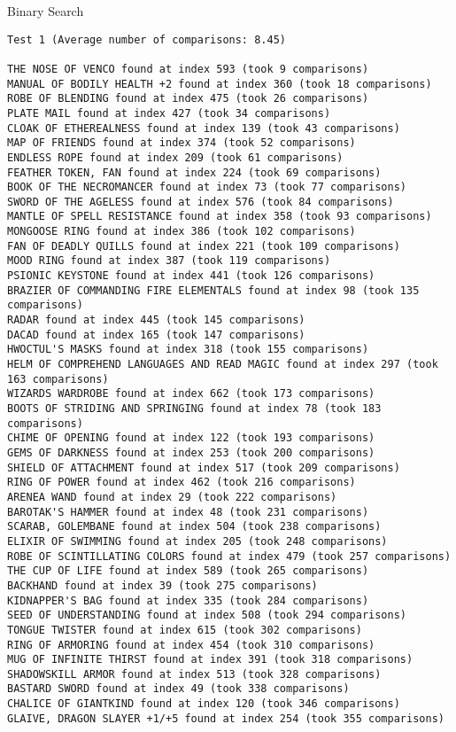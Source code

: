 \documentclass{article}
\begin{document}
\pagebreak
 
\begin{large}
    Binary Search
\end{large}

\begin{verbatim}
Test 1 (Average number of comparisons: 8.45)

THE NOSE OF VENCO found at index 593 (took 9 comparisons)
MANUAL OF BODILY HEALTH +2 found at index 360 (took 18 comparisons)
ROBE OF BLENDING found at index 475 (took 26 comparisons)
PLATE MAIL found at index 427 (took 34 comparisons)
CLOAK OF ETHEREALNESS found at index 139 (took 43 comparisons)
MAP OF FRIENDS found at index 374 (took 52 comparisons)
ENDLESS ROPE found at index 209 (took 61 comparisons)
FEATHER TOKEN, FAN found at index 224 (took 69 comparisons)
BOOK OF THE NECROMANCER found at index 73 (took 77 comparisons)
SWORD OF THE AGELESS found at index 576 (took 84 comparisons)
MANTLE OF SPELL RESISTANCE found at index 358 (took 93 comparisons)
MONGOOSE RING found at index 386 (took 102 comparisons)
FAN OF DEADLY QUILLS found at index 221 (took 109 comparisons)
MOOD RING found at index 387 (took 119 comparisons)
PSIONIC KEYSTONE found at index 441 (took 126 comparisons)
BRAZIER OF COMMANDING FIRE ELEMENTALS found at index 98 (took 135 comparisons)
RADAR found at index 445 (took 145 comparisons)
DACAD found at index 165 (took 147 comparisons)
HWOCTUL'S MASKS found at index 318 (took 155 comparisons)
HELM OF COMPREHEND LANGUAGES AND READ MAGIC found at index 297 (took 163 comparisons)
WIZARDS WARDROBE found at index 662 (took 173 comparisons)
BOOTS OF STRIDING AND SPRINGING found at index 78 (took 183 comparisons)
CHIME OF OPENING found at index 122 (took 193 comparisons)
GEMS OF DARKNESS found at index 253 (took 200 comparisons)
SHIELD OF ATTACHMENT found at index 517 (took 209 comparisons)
RING OF POWER found at index 462 (took 216 comparisons)
ARENEA WAND found at index 29 (took 222 comparisons)
BAROTAK'S HAMMER found at index 48 (took 231 comparisons)
SCARAB, GOLEMBANE found at index 504 (took 238 comparisons)
ELIXIR OF SWIMMING found at index 205 (took 248 comparisons)
ROBE OF SCINTILLATING COLORS found at index 479 (took 257 comparisons)
THE CUP OF LIFE found at index 589 (took 265 comparisons)
BACKHAND found at index 39 (took 275 comparisons)
KIDNAPPER'S BAG found at index 335 (took 284 comparisons)
SEED OF UNDERSTANDING found at index 508 (took 294 comparisons)
TONGUE TWISTER found at index 615 (took 302 comparisons)
RING OF ARMORING found at index 454 (took 310 comparisons)
MUG OF INFINITE THIRST found at index 391 (took 318 comparisons)
SHADOWSKILL ARMOR found at index 513 (took 328 comparisons)
BASTARD SWORD found at index 49 (took 338 comparisons)
CHALICE OF GIANTKIND found at index 120 (took 346 comparisons)
GLAIVE, DRAGON SLAYER +1/+5 found at index 254 (took 355 comparisons)
\end{verbatim}
\end{document}
